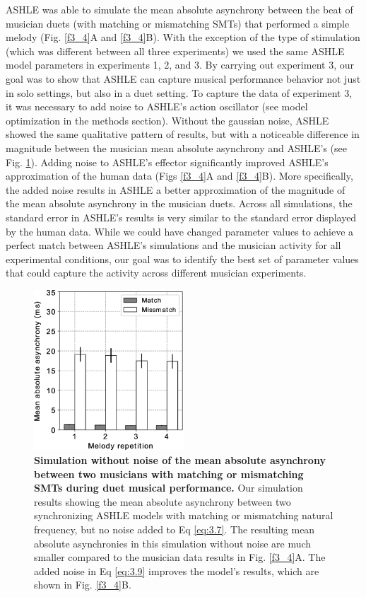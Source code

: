 \documentclass{report}
\begin{document}
ASHLE was able to simulate the mean absolute asynchrony between the beat of musician duets (with matching or mismatching SMTs) that performed a simple melody (Fig.{} \ref{f3_4}A and \ref{f3_4}B). With the exception of the type of stimulation (which was different between all three experiments) we used the same ASHLE model parameters in experiments 1, 2, and 3. By carrying out experiment 3, our goal was to show that ASHLE can capture musical performance behavior not just in solo settings, but also in a duet setting. To capture the data of experiment 3, it was necessary to add noise to ASHLE's action oscillator (see model optimization in the methods section). Without the gaussian noise, ASHLE showed the same qualitative pattern of results, but with a noticeable difference in magnitude between the musician mean absolute asynchrony and ASHLE's (see Fig.{} \ref{f3_5}). Adding noise to ASHLE's effector significantly improved ASHLE's approximation of the human data (Figs \ref{f3_4}A and \ref{f3_4}B). More specifically, the added noise results in ASHLE a better approximation of the magnitude of the mean absolute asynchrony in the musician duets. Across all simulations, the standard error in ASHLE's results is very similar to the standard error displayed by the human data. While we could have changed parameter values to achieve a perfect match between ASHLE's simulations and the musician activity for all experimental conditions, our goal was to identify the best set of parameter values that could capture the activity across different musician experiments.

\begin{figure}
    \centering
    \includegraphics[width=0.5\textwidth]{figures/fig3_5.png}
    \caption[Simulation without noise of the mean absolute asynchrony between two musicians with matching or mismatching SMTs during duet musical performance]{\textbf{Simulation without noise of the mean absolute asynchrony between two musicians with matching or mismatching SMTs during duet musical performance.} Our simulation results showing the mean absolute asynchrony between two synchronizing ASHLE models with matching or mismatching natural frequency, but no noise added to Eq \eqref{eq:3.7}. The resulting mean absolute asynchronies in this simulation without noise are much smaller compared to the musician data results in Fig.{} \ref{f3_4}A. The added noise in Eq \eqref{eq:3.9} improves the model's results, which are shown in Fig.{} \ref{f3_4}B.}
    \label{f3_5}
\end{figure}
\end{document}
